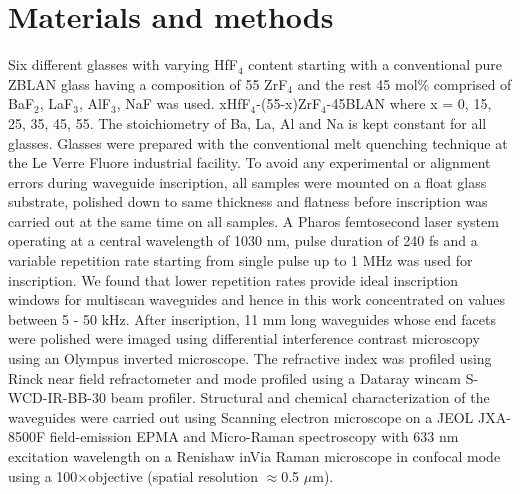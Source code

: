 \documentclass[11pt]{article}
\begin{document}
\section*{Materials and methods}
Six different glasses with varying HfF$_4$ content starting with a conventional pure ZBLAN glass having a composition of 55 ZrF$_4$ and the rest 45 mol\% comprised of BaF$_2$, LaF$_3$, AlF$_3$, NaF was used. xHfF$_4$-(55-x)ZrF$_4$-45BLAN where x = 0, 15, 25, 35, 45, 55. The stoichiometry of Ba, La, Al and Na is kept constant for all glasses. Glasses were prepared with the conventional melt quenching technique at the Le Verre Fluore industrial facility. To avoid any experimental or alignment errors during waveguide inscription, all samples were mounted on a float glass substrate, polished down to same thickness and flatness before inscription was carried out at the same time on all samples. A Pharos femtosecond laser system operating at a central wavelength of 1030 nm, pulse duration of 240 fs and a variable repetition rate starting from single pulse up to 1 MHz was used for inscription. We found that lower repetition rates provide ideal inscription windows for multiscan waveguides and hence in this work concentrated on values between 5 - 50 kHz. After inscription, 11 mm long waveguides whose end facets were polished were imaged using differential interference contrast microscopy using an Olympus inverted microscope. The refractive index was profiled using Rinck near field refractometer and mode profiled using a Dataray wincam S-WCD-IR-BB-30 beam profiler. Structural and chemical characterization of the waveguides were carried out using Scanning electron microscope on a JEOL JXA-8500F field-emission EPMA and Micro-Raman spectroscopy with 633 nm excitation wavelength on a Renishaw inVia Raman microscope in confocal mode using a 100×objective (spatial resolution $\approx$0.5 $\mu$m). 
\end{document}

